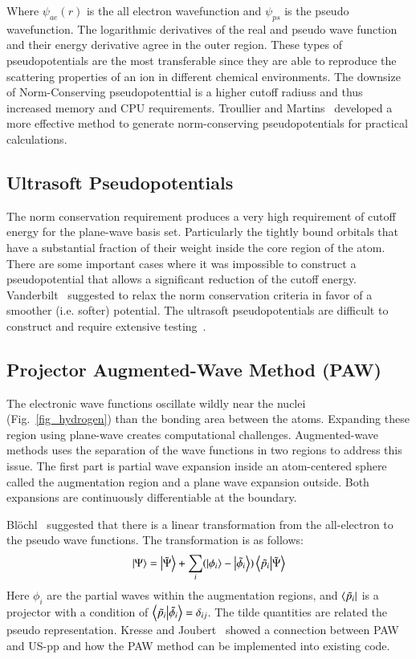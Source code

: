 

Where $\psi_{ae}(r)$ is the all electron wavefunction and $\psi_{ps}$ is the pseudo wavefunction. The logarithmic derivatives of the real and pseudo wave function and their energy derivative agree in the outer region. These types of pseudopotentials are the most transferable since they are able to reproduce the scattering properties of an ion in different chemical environments\cite{hamann1979norm}. The downsize of Norm-Conserving pseudopotenttial is a higher cutoff radiuss and thus increased memory and CPU requirements. Troullier and Martins~\cite{troullier1991efficient} developed a more effective method to generate norm-conserving pseudopotentials for practical calculations. 

\subsection{Ultrasoft Pseudopotentials}
The norm conservation requirement produces a very high requirement of cutoff energy for the plane-wave basis set. Particularly the tightly bound orbitals that have a substantial fraction of their weight inside the core region of the atom. There are some important cases where it was impossible to construct a pseudopotential that allows a significant reduction of the cutoff energy. Vanderbilt~\cite{vanderbilt1990soft} suggested to relax the norm conservation criteria in favor of a smoother (i.e. softer) potential. The ultrasoft pseudopotentials are difficult to construct and require extensive testing~\cite{kresse1999ultrasoft}.

\subsection{Projector Augmented-Wave Method (PAW)}
The electronic wave functions oscillate wildly near the nuclei (Fig.~\ref{fig_hydrogen}) than the bonding area between the atoms. Expanding these region using plane-wave creates computational challenges. Augmented-wave methods uses the separation of the wave functions in two regions to address this issue. The first part is partial wave expansion inside an atom-centered sphere called the augmentation region and a plane wave expansion outside. Both expansions are continuously differentiable at the boundary.

Bl\"ochl~\cite{Bloechl1994} suggested that there is a linear transformation from the all-electron to the pseudo wave functions. The transformation is as follows:
\begin{equation}
\ket{\Psi} = \ket{\tilde{\Psi}} + \sum_i (\ket{\phi_i} - \ket{\tilde{\phi_i}})\braket{\tilde{p_i}}{\tilde{\Psi}}
\end{equation}
Here $\phi_i$ are the partial waves within the augmentation regions, and $\bra{\tilde{p_i}}$ is a projector with a condition of $\braket{\tilde{p_i}}{\tilde{\phi_i}} = \delta_{ij}$. The tilde quantities are related the pseudo representation. Kresse and Joubert~\cite{kresse1999ultrasoft} showed a connection between PAW and US-pp and how the PAW method can be implemented into existing code.





